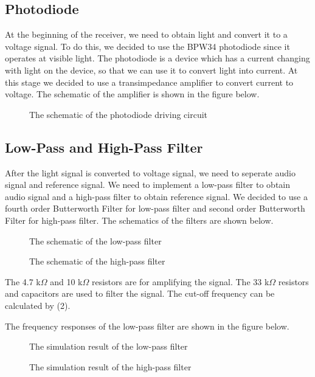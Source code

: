\documentclass[conference]{IEEEtran}
\begin{document}
\subsection{Photodiode}
At the beginning of the receiver, we need to obtain light and convert it to a voltage signal. To do this, we decided to use the BPW34 photodiode \cite{BPW34} 
since it operates at visible light. The photodiode is a device which has a current changing with light on the device, so that we can use it 
to convert light into current. At this stage we decided to use a transimpedance amplifier to convert current to voltage. The schematic of the amplifier 
is shown in the figure below.
\begin{figure}[H]
  \centerline{}
  \caption{The schematic of the photodiode driving circuit}
\end{figure} 


\subsection{Low-Pass and High-Pass Filter}
After the light signal is converted to voltage signal, we need to seperate audio signal and reference signal. We need to implement 
a low-pass filter to obtain audio signal and a high-pass filter to obtain reference signal. We decided to use a fourth order Butterworth 
Filter \cite{butterworth} for low-pass filter and second order Butterworth Filter for high-pass filter. The schematics of the filters are shown below. 
\begin{figure}[H]
   \centerline{}
    \caption{The schematic of the low-pass filter}
\end{figure}
\begin{figure}[H]
   \centerline{}
    \caption{The schematic of the high-pass filter}
\end{figure}


The 4.7 k\(\Omega\) and 10 k\(\Omega\) resistors are for amplifying the signal. The 33 k\(\Omega\) resistors and capacitors are used to filter the signal. 
The cut-off frequency can be calculated by (2).

The frequency responses of the low-pass filter are shown in the figure below. 
\begin{figure}[H]
   \centerline{}
    \caption{The simulation result of the low-pass filter}
\end{figure}
\begin{figure}[H]
   \centerline{}
    \caption{The simulation result of the high-pass filter}
\end{figure}
\end{document}
